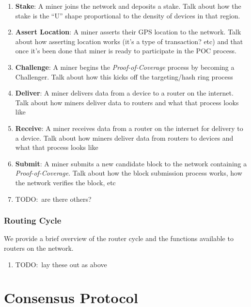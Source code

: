 \documentclass[letterpaper,11pt]{article}
\newcommand{\todo}[1]{}
\renewcommand{\todo}[1]{{\color{red} TODO:\ {#1}}}
\begin{document}
\begin{enumerate}
  \item \textbf{Stake}: A miner joins the network and deposits a stake.
  Talk about how the stake is the ``U'' shape proportional to the density of devices in that region.

  \item \textbf{Assert Location}: A miner asserts their GPS location to the network.
  Talk about how asserting location works (it's a type of transaction? etc) and that once it's been done that miner is ready to participate in the POC process.

  \item \textbf{Challenge}: A miner begins the \emph{Proof-of-Coverage} process by becoming a Challenger.
  Talk about how this kicks off the targeting/hash ring process

  \item \textbf{Deliver}: A miner delivers data from a device to a router on the internet.
  Talk about how miners deliver data to routers and what that process looks like

  \item \textbf{Receive}: A miner receives data from a router on the internet for delivery to a device.
  Talk about how miners deliver data from routers to devices and what that process looks like

  \item \textbf{Submit}: A miner submits a new candidate block to the network containing a \emph{Proof-of-Coverage}.
  Talk about how the block submission process works, how the network verifies the block, etc

  \item \todo{are there others?}

\end{enumerate}

\subsubsection{Routing Cycle}

We provide a brief overview of the router cycle and the functions available to routers on the network.

\begin{enumerate}
  \item \todo{lay these out as above}
\end{enumerate}

\newpage

\section{Consensus Protocol}\label{consensus}
\end{document}
